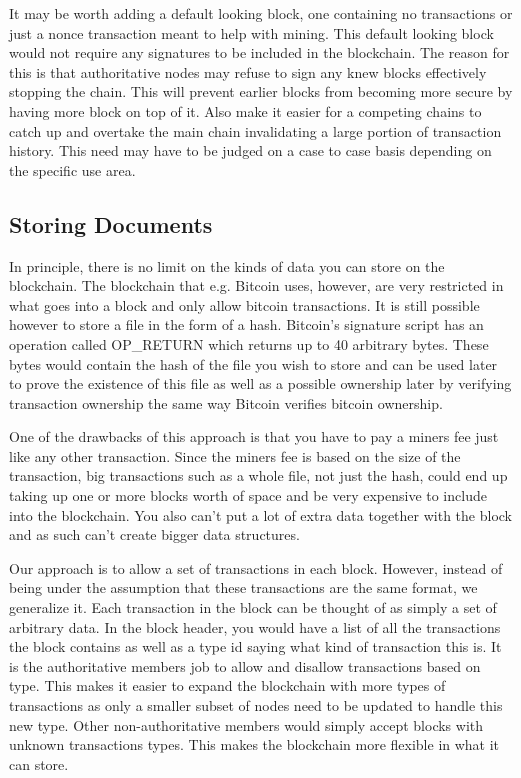 \documentclass[12pt]{article}
\begin{document}
It may be worth adding a default looking block, one containing no transactions or just a nonce transaction meant to help with mining. This default looking block would not require any signatures to be included in the blockchain. The reason for this is that authoritative nodes may refuse to sign any knew blocks effectively stopping the chain. This will prevent earlier blocks from becoming more secure by having more block on top of it. Also make it easier for a competing chains to catch up and overtake the main chain invalidating a large portion of transaction history. This need may have to be judged on a case to case basis depending on the specific use area.

\subsection{Storing Documents}

In principle, there is no limit on the kinds of data you can store on the blockchain. The blockchain that e.g. Bitcoin uses, however, are very restricted in what goes into a block and only allow bitcoin transactions. It is still possible however to store a file in the form of a hash. Bitcoin's signature script has an operation called OP\_RETURN which returns up to 40 arbitrary bytes. These bytes would contain the hash of the file you wish to store and can be used later to prove the existence of this file as well as a possible ownership later by verifying transaction ownership the same way Bitcoin verifies bitcoin ownership.

One of the drawbacks of this approach is that you have to pay a miners fee just like any other transaction. Since the miners fee is based on the size of the transaction, big transactions such as a whole file, not just the hash, could end up taking up one or more blocks worth of space and be very expensive to include into the blockchain. You also can't put a lot of extra data together with the block and as such can't create bigger data structures.

Our approach is to allow a set of transactions in each block. However, instead of being under the assumption that these transactions are the same format, we generalize it. Each transaction in the block can be thought of as simply a set of arbitrary data. In the block header, you would have a list of all the transactions the block contains as well as a type id saying what kind of transaction this is. It is the authoritative members job to allow and disallow transactions based on type. This makes it easier to expand the blockchain with more types of transactions as only a smaller subset of nodes need to be updated to handle this new type. Other non-authoritative members would simply accept blocks with unknown transactions types. This makes the blockchain more flexible in what it can store.
\end{document}
